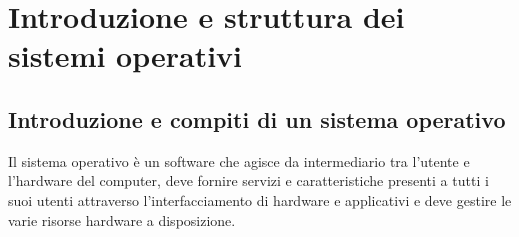 \documentclass[a4paper]{article}
\begin{document}

\section{Introduzione e struttura dei sistemi operativi}


\subsection{Introduzione e compiti di un sistema operativo}
Il sistema operativo è un software che agisce da intermediario tra l’utente e l’hardware del computer, deve fornire servizi e
caratteristiche presenti a tutti i suoi utenti attraverso l'interfacciamento di hardware e applicativi e deve gestire le varie
risorse hardware a disposizione.
\end{document}
